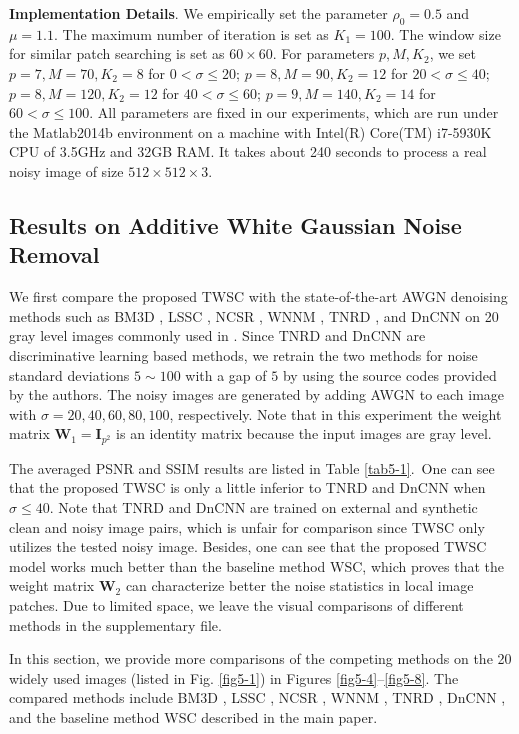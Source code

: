 \textbf{Implementation Details}. We empirically set the parameter $\rho_{0}=0.5$ and $\mu=1.1$. The maximum number of iteration is set as $K_{1}=100$. The window size for similar patch searching is set as $60\times60$. For parameters $p,M,K_{2}$, we set $p=7,M=70,K_{2}=8$ for $0<\sigma\le20$; $p=8,M=90,K_{2}=12$ for $20<\sigma\le40$; $p=8,M=120,K_{2}=12$ for $40<\sigma\le60$; $p=9,M=140,K_{2}=14$ for $60<\sigma\le100$. All parameters are fixed in our experiments, which are run under the Matlab2014b environment on a machine with Intel(R) Core(TM) i7-5930K CPU of 3.5GHz and 32GB RAM. It takes about 240 seconds to process a real noisy image of size $512\times512\times3$.


\subsection{Results on Additive White Gaussian Noise Removal}

We first compare the proposed TWSC with the state-of-the-art AWGN denoising methods such as BM3D \cite{bm3d}, LSSC \cite{lssc}, NCSR \cite{ncsr}, WNNM \cite{wnnm}, TNRD \cite{chen2015learning}, and DnCNN \cite{dncnn} on 20 gray level images commonly used in \cite{bm3d}. Since TNRD and DnCNN are discriminative learning based methods, we retrain the two methods for noise standard deviations $5\sim100$ with a gap of $5$ by using the source codes provided by the authors. The noisy images are generated by adding AWGN to each image with $\sigma=20,40,60,80,100$, respectively. Note that in this experiment the weight matrix $\bm{W}_{1}=\bm{I}_{p^2}$ is an identity matrix because the input images are gray level.

The averaged PSNR and SSIM \cite{ssim} results are listed in Table \ref{tab5-1}.\ One can see that the proposed TWSC is only a little inferior to TNRD and DnCNN when $\sigma\le40$. Note that TNRD and DnCNN are trained on external and synthetic clean and noisy image pairs, which is unfair for comparison since TWSC only utilizes the tested noisy image. Besides, one can see that the proposed TWSC model works much better than the baseline method WSC, which proves that the weight matrix $\bm{W}_{2}$ can characterize better the noise statistics in local image patches. Due to limited space, we leave the visual comparisons of different methods in the supplementary file.

In this section, we provide more comparisons of the competing methods on the 20 widely used images (listed in Fig. \ref{fig5-1}) in Figures \ref{fig5-4}--\ref{fig5-8}. The compared methods include BM3D \cite{bm3d}, LSSC \cite{lssc}, NCSR \cite{ncsr}, WNNM \cite{wnnm}, TNRD \cite{chen2015learning}, DnCNN \cite{dncnn}, and the baseline method WSC described in the main paper.
 

